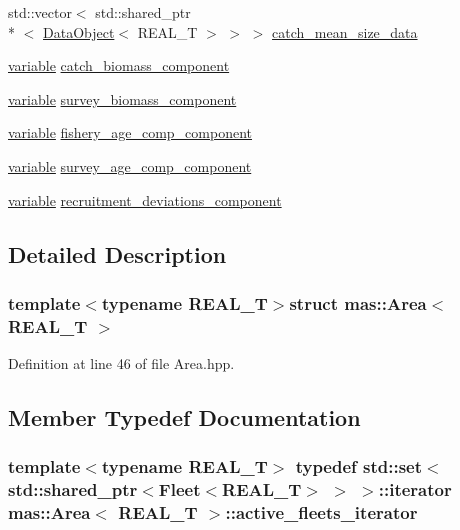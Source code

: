 \begin{DoxyCompactItemize}
\item 
std\-::vector$<$ std\-::shared\-\_\-ptr\\*
$<$ \hyperlink{structmas_1_1_data_object}{Data\-Object}$<$ R\-E\-A\-L\-\_\-\-T $>$ $>$ $>$ \hyperlink{structmas_1_1_area_af01729bc7ed50ebd5238fc2332e21501}{catch\-\_\-mean\-\_\-size\-\_\-data}
\item 
\hyperlink{structmas_1_1_area_a3fb53ebc27c5323de15a81fbfbc7c878}{variable} \hyperlink{structmas_1_1_area_ac0c9427ab19559cd60bbf26c1ac75c63}{catch\-\_\-biomass\-\_\-component}
\item 
\hyperlink{structmas_1_1_area_a3fb53ebc27c5323de15a81fbfbc7c878}{variable} \hyperlink{structmas_1_1_area_a8b7482442ba3e2008120c09b14343f56}{survey\-\_\-biomass\-\_\-component}
\item 
\hyperlink{structmas_1_1_area_a3fb53ebc27c5323de15a81fbfbc7c878}{variable} \hyperlink{structmas_1_1_area_a21ab68ae7dd85bcae3c3094f08b5ccb9}{fishery\-\_\-age\-\_\-comp\-\_\-component}
\item 
\hyperlink{structmas_1_1_area_a3fb53ebc27c5323de15a81fbfbc7c878}{variable} \hyperlink{structmas_1_1_area_ac9d145e72568af28ce8c973dffab11b3}{survey\-\_\-age\-\_\-comp\-\_\-component}
\item 
\hyperlink{structmas_1_1_area_a3fb53ebc27c5323de15a81fbfbc7c878}{variable} \hyperlink{structmas_1_1_area_aaa231bd2abc74fef23bd8fcf4644236a}{recruitment\-\_\-deviations\-\_\-component}
\end{DoxyCompactItemize}


\subsection{Detailed Description}
\subsubsection*{template$<$typename R\-E\-A\-L\-\_\-\-T$>$struct mas\-::\-Area$<$ R\-E\-A\-L\-\_\-\-T $>$}



Definition at line 46 of file Area.\-hpp.



\subsection{Member Typedef Documentation}
\hypertarget{structmas_1_1_area_afac4316f68a1431235c7d28968655ad7}{
\subsubsection[{active\-\_\-fleets\-\_\-iterator}]{\setlength{\rightskip}{0pt plus 5cm}template$<$typename R\-E\-A\-L\-\_\-\-T$>$ typedef std\-::set$<$std\-::shared\-\_\-ptr$<${\bf Fleet}$<$R\-E\-A\-L\-\_\-\-T$>$ $>$ $>$\-::iterator {\bf mas\-::\-Area}$<$ R\-E\-A\-L\-\_\-\-T $>$\-::{\bf active\-\_\-fleets\-\_\-iterator}}}\label{structmas_1_1_area_afac4316f68a1431235c7d28968655ad7}


